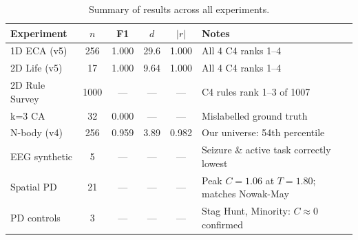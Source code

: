 \documentclass[12pt,a4paper]{article}
\begin{document}
\begin{table}[h]
\centering
\caption{Summary of results across all experiments.}
\begin{tabular}{lccccl}
\toprule
Experiment & $n$ & F1 & $d$ & $|r|$ & Notes \\
\midrule
1D ECA (v5)      & 256  & 1.000 & 29.6 & 1.000
  & All 4 C4 ranks 1--4 \\
2D Life (v5)     & 17   & 1.000 & 9.64 & 1.000
  & All 4 C4 ranks 1--4 \\
2D Rule Survey   & 1000 & ---   & ---  & ---
  & C4 rules rank 1--3 of 1007 \\
k=3 CA           & 32   & 0.000 & ---  & ---
  & Mislabelled ground truth \\
N-body (v4)      & 256  & 0.959 & 3.89 & 0.982
  & Our universe: 54th percentile \\
EEG synthetic    & 5    & ---   & ---  & ---
  & Seizure \& active task correctly lowest \\
Spatial PD       & 21   & ---   & ---  & ---
  & Peak $C\!=\!1.06$ at $T\!=\!1.80$; matches Nowak-May \\
PD controls      & 3    & ---   & ---  & ---
  & Stag Hunt, Minority: $C\!\approx\!0$ confirmed \\
\bottomrule
\end{tabular}
\end{table}
\end{document}
